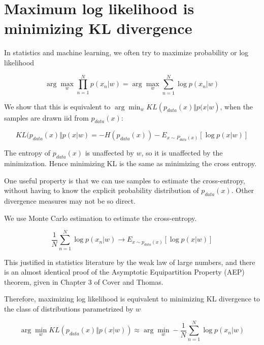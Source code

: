 \documentclass[a4paper]{article}
\begin{document}
\section{Maximum log likelihood is minimizing KL divergence}

In statistics and machine learning, we often try to maximize probability or log likelihood

\begin{equation}
  \arg\max_w \prod_{n=1}^N p( x_n \vert w) = \arg\max_w \sum_{n=1}^N \log p( x_n \vert w )
  \label{}
\end{equation}

We show that this is equivalent to $ \arg \min_w KL\left( p_{data}(x) \Vert p(x \vert w \right) $, when the samples are drawn iid from $p_{data}(x)$:

\begin{equation}
  KL( p_{data}(x) \Vert p(x \vert w ) = - H\left( p_{data}(x) \right) - E_{ x \sim P_{data}(x) } \left[ \log p( x \vert w) \right]
  \label{}
\end{equation}

The entropy of $p_{data}(x)$ is unaffected by $w$, so it is unaffected by the minimization. Hence minimizing KL is the same as minimizing the cross entropy.

One useful property is that we can use samples to estimate the cross-entropy, without having to know the explicit probability distribution of $p_{data}(x)$. Other divergence measures may not be so direct.

We use Monte Carlo estimation to estimate the cross-entropy.

\begin{equation}
  \frac{1}{N} \sum_{n=1}^N \log p(x_n \vert w) \rightarrow E_{ x \sim p_{data}(x)} \left[ \log p(x \vert w) \right]
  \label{}
\end{equation}

This justified in statistics literature by the weak law of large numbers, and there is an almost identical proof of the Asymptotic Equipartition Property (AEP) theorem, given in Chapter 3 of Cover and Thomas.

Therefore, maximizing log likelihood is equivalent to minimizing KL divergence to the class of distributions parametrized by $w$

\begin{equation}
  \arg \min_w KL \left( p_{data}(x) \Vert p(x \vert w) \right) \approx \arg \min_w - \frac{1}{N} \sum_{n=1}^N \log p(x_n \vert w)
  \label{}
\end{equation}
\end{document}
